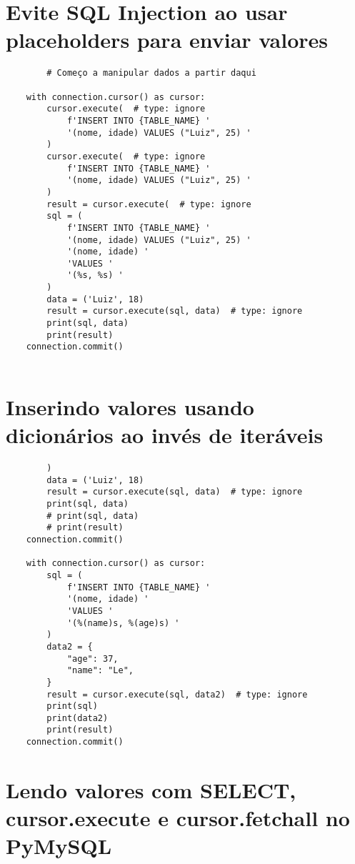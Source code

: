 \documentclass{article}
\begin{document}
    \section{Evite SQL Injection ao usar placeholders para enviar valores }

    \begin{lstlisting}
        # Começo a manipular dados a partir daqui

    with connection.cursor() as cursor:
        cursor.execute(  # type: ignore
            f'INSERT INTO {TABLE_NAME} '
            '(nome, idade) VALUES ("Luiz", 25) '
        )
        cursor.execute(  # type: ignore
            f'INSERT INTO {TABLE_NAME} '
            '(nome, idade) VALUES ("Luiz", 25) '
        )
        result = cursor.execute(  # type: ignore
        sql = (
            f'INSERT INTO {TABLE_NAME} '
            '(nome, idade) VALUES ("Luiz", 25) '
            '(nome, idade) '
            'VALUES '
            '(%s, %s) '
        )
        data = ('Luiz', 18)
        result = cursor.execute(sql, data)  # type: ignore
        print(sql, data)
        print(result)
    connection.commit()
        
    \end{lstlisting}

    \section{Inserindo valores usando dicionários ao invés de iteráveis}
    \begin{lstlisting}
        )
        data = ('Luiz', 18)
        result = cursor.execute(sql, data)  # type: ignore
        print(sql, data)
        # print(sql, data)
        # print(result)
    connection.commit()

    with connection.cursor() as cursor:
        sql = (
            f'INSERT INTO {TABLE_NAME} '
            '(nome, idade) '
            'VALUES '
            '(%(name)s, %(age)s) '
        )
        data2 = {
            "age": 37,
            "name": "Le",
        }
        result = cursor.execute(sql, data2)  # type: ignore
        print(sql)
        print(data2)
        print(result)
    connection.commit()
    \end{lstlisting}

    \section{Lendo valores com SELECT, cursor.execute e cursor.fetchall no PyMySQL}
    
\end{document}
